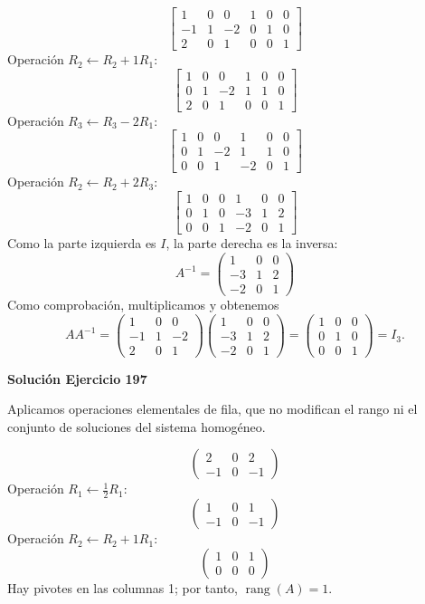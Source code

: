 \documentclass[12pt]{article}
\theoremstyle{remark}
\newcommand{\rang}{\operatorname{rang}}
\begin{document}
\[
\left[\begin{array}{rrr|rrr}1&0&0&1&0&0\\-1&1&-2&0&1&0\\2&0&1&0&0&1\end{array}\right]
\]
Operación $R_{2}\leftarrow R_{2}+1R_{1}$:
\[
\left[\begin{array}{rrr|rrr}1&0&0&1&0&0\\0&1&-2&1&1&0\\2&0&1&0&0&1\end{array}\right]
\]
Operación $R_{3}\leftarrow R_{3}-2R_{1}$:
\[
\left[\begin{array}{rrr|rrr}1&0&0&1&0&0\\0&1&-2&1&1&0\\0&0&1&-2&0&1\end{array}\right]
\]
Operación $R_{2}\leftarrow R_{2}+2R_{3}$:
\[
\left[\begin{array}{rrr|rrr}1&0&0&1&0&0\\0&1&0&-3&1&2\\0&0&1&-2&0&1\end{array}\right]
\]
Como la parte izquierda es $I$, la parte derecha es la inversa:
\[
\boxed{A^{-1}=\begin{pmatrix}1&0&0\\-3&1&2\\-2&0&1\end{pmatrix}}
\]
Como comprobación, multiplicamos y obtenemos
\[
AA^{-1}=\begin{pmatrix}1&0&0\\-1&1&-2\\2&0&1\end{pmatrix}\begin{pmatrix}1&0&0\\-3&1&2\\-2&0&1\end{pmatrix}=\begin{pmatrix}1&0&0\\0&1&0\\0&0&1\end{pmatrix}=I_{3}.
\]

\par\bigskip\noindent\textbf{Solución Ejercicio 197}\par\nobreak
Aplicamos operaciones elementales de fila, que no modifican el rango ni el conjunto de soluciones del sistema homogéneo.

\[
\begin{pmatrix}2&0&2\\-1&0&-1\end{pmatrix}
\]
Operación $R_{1}\leftarrow \frac{1}{2}R_{1}$:
\[
\begin{pmatrix}1&0&1\\-1&0&-1\end{pmatrix}
\]
Operación $R_{2}\leftarrow R_{2}+1R_{1}$:
\[
\begin{pmatrix}1&0&1\\0&0&0\end{pmatrix}
\]
Hay pivotes en las columnas 1; por tanto, $\boxed{\rang(A)=1}$.
\end{document}
